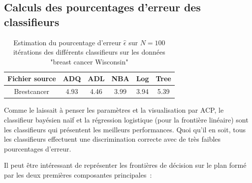 \documentclass[a4paper,10pt]{report}
\begin{document}
\subsection{Calculs des pourcentages d'erreur des classifieurs}

\begin{table}[H]
	\centering
	\captionsetup{justification=centering, margin=4cm}
	\begin{tabular}{c|c|c|c|c|c}
		Fichier source & ADQ & ADL & NBA & Log & Tree \\ 
		\hline
		Brestcancer & 4.93 & 4.46 & 3.99 & 3.94 & 5.39 \\ 
	\end{tabular}
	\caption{\small Estimation du pourcentage d'erreur $\hat{\epsilon}$ sur $N=100$ itérations des différents classifieurs sur les données "breast cancer Wisconsin"}
	\label{table:2-1-erreur-data-breastcancer}
\end{table}


Comme le laissait à penser les paramètres et la visualisation par ACP, le classifieur bayésien naïf et la régression logistique (pour la frontière linéaire) sont les classifieurs qui présentent les meilleurs performances. Quoi qu'il en soit, tous les classifieurs effectuent une discrimination correcte avec de très faibles pourcentages d'erreur.

Il peut être intéressant de représenter les frontières de décision sur le plan formé par les deux premières composantes principales~:
\end{document}
